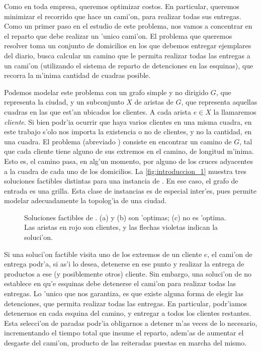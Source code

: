 Como en toda empresa, queremos optimizar costos. En particular, queremos minimizar el recorrido que hace un cami'on, para realizar todas sus entregas. Como un primer paso en el estudio de este problema, nos vamos a concentrar en el reparto que debe realizar un 'unico cami'on. El problema que queremos resolver toma un conjunto de domicilios en los que debemos entregar ejemplares del diario, busca calcular un camino que le permita realizar todas las entregas a un cami'on (utilizando el sistema de reparto de detenciones en las esquinas), que recorra la m'inima cantidad de cuadras posible.

Podemos modelar este problema con un grafo simple y no dirigido $G$, que representa la ciudad, y un subconjunto $X$ de aristas de $G$, que representa aquellas cuadras en las que est'an ubicados los clientes. A cada arista $e \in X$ la llamaremos \textit{cliente}. Si bien podr'ia ocurrir que haya varios clientes en una misma cuadra, en este trabajo s'olo nos importa la existencia o no de clientes, y no la cantidad, en una cuadra. El problema  (abreviado ) consiste en encontrar un camino de $G$, tal que cada cliente tiene alguno de sus extremos en el camino, de longitud m'inima. Esto es, el camino pasa, en alg'un momento, por alguno de los cruces adyacentes a la cuadra de cada uno de los domicilios. La \autoref{fig:introduccion_1} muestra tres soluciones factibles distintas para una instancia de . En ese caso, el grafo de entrada es una grilla. Esta clase de instancias es de especial inter'es, pues permite modelar adecuadamente la topolog'ia de una ciudad.

\begin{figure}[h]
	\begin{center}
		
	\end{center}		
	\caption{Soluciones factibles de . (a) y (b) son 'optimas; (c) no es 'optima. Las aristas en rojo son clientes, y las flechas violetas indican la soluci'on.}
	\label{fig:introduccion_1}
\end{figure}

Si una soluci'on factible visita uno de los extremos de un cliente $e$, el cami'on de entrega podr'a, si as'i lo desea, detenerse en ese punto y realizar la entrega de productos a ese (y posiblemente otros) cliente. Sin embargo, una soluci'on de  no establece en qu'e esquinas debe detenerse el cami'on para realizar todas las entregas. Lo 'unico que nos garantiza, es que existe alguna forma de elegir las detenciones, que permita realizar todas las entregas. En particular, podr'iamos detenernos en cada esquina del camino, y entregar a todos los clientes restantes. Esta selecci'on de paradas podr'ia obligarnos a detener m'as veces de lo necesario, incrementando el tiempo total que insume el reparto, adem'as de aumentar el desgaste del cami'on, producto de las reiteradas puestas en marcha del mismo.

